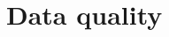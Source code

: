 \documentclass[../thesis.tex]{subfiles}
\begin{document}
\chapter{Data quality}
\label{chap:dq}
\end{document}
